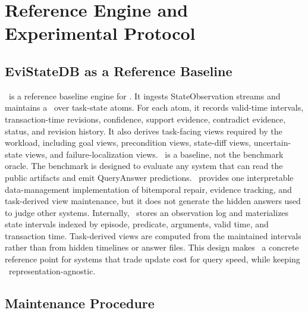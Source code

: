 
\section{Reference Engine and Experimental Protocol}
\label{sec:protocol}

\subsection{EviStateDB as a Reference Baseline}

\engine\ is a reference baseline engine for \bench. It ingests StateObservation streams and maintains a \tsv\ over task-state atoms. For each atom, it records valid-time intervals, transaction-time revisions, confidence, support evidence, contradict evidence, status, and revision history. It also derives task-facing views required by the workload, including goal views, precondition views, state-diff views, uncertain-state views, and failure-localization views.
\engine\ is a baseline, not the benchmark oracle. The benchmark is designed to evaluate any system that can read the public artifacts and emit QueryAnswer predictions. \engine\ provides one interpretable data-management implementation of bitemporal repair, evidence tracking, and task-derived view maintenance, but it does not generate the hidden answers used to judge other systems.
Internally, \engine\ stores an observation log and materializes state intervals indexed by episode, predicate, arguments, valid time, and transaction time. Task-derived views are computed from the maintained intervals rather than from hidden timelines or answer files. This design makes \engine\ a concrete reference point for systems that trade update cost for query speed, while keeping \bench\ representation-agnostic.


\subsection{Maintenance Procedure}

